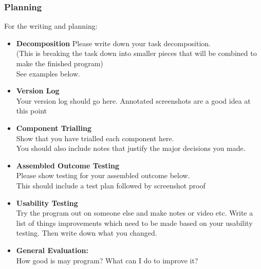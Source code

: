\documentclass[a4paper,12pt]{article}
\begin{document}
\subsubsection{Planning}
For the writing and planning:
\begin{itemize}
	\item \textbf{Decomposition}
Please write down your task decomposition.\\
(This is breaking the task down into smaller pieces that will be combined to make the finished program)\\
See examples below.
\item \textbf{Version Log}\\
Your version log should go here.  Annotated screenshots are a good idea at this point
\item \textbf{Component Trialling}\\
Show that you have trialled each component here.  \\
You should also include notes that justify the major decisions you made.
\item \textbf{Assembled Outcome Testing}\\
Please show testing for your assembled outcome below. \\
This should include a test plan followed by screenshot proof
\item \textbf{Usability Testing}\\
Try the program out on someone else and make notes or video etc.
Write a list of things improvements which need to be made based on your usability testing.  Then write down what you changed.
\item \textbf{General Evaluation:}\\
How good is may program? What can I do to improve it?
\end{itemize}
\end{document}
